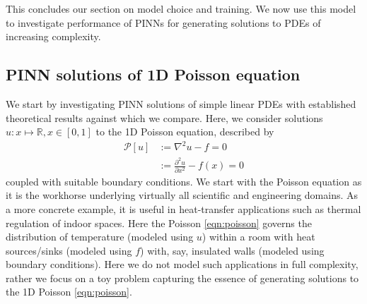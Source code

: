 \documentclass[11pt]{article}
\newcommand{\pde}{\ensuremath{\mathcal{P}}}
\begin{document}
This concludes our section on model choice and training. We now use this
model to investigate performance of
PINNs for generating solutions to PDEs of increasing complexity.

\subsection{PINN solutions of 1D Poisson equation}
\label{sec:poisson}
We start by investigating PINN solutions of simple linear PDEs with
established theoretical results against which we compare. Here, we consider
solutions \(u : x \mapsto \mathbb{R}, x \in [0, 1]\) to the 1D Poisson equation, described by
\begin{equation}
\label{eqn:poisson}
\begin{aligned}
	\pde[ u ] &:= \nabla^2 u  - f = 0 \\
	   		  &:= \frac{\partial^2 u}{\partial x^2} - f(x) = 0
\end{aligned}
\end{equation}
coupled with suitable boundary conditions. We start with the Poisson equation
as it is the workhorse
underlying virtually all scientific and engineering domains. As a more
concrete example, it is useful in heat-transfer applications such as thermal
regulation of indoor spaces. Here the Poisson \cref{eqn:poisson} governs the
distribution of temperature (modeled using \(u\)) within a room with heat
sources/sinks (modeled using \(f\)) with, say, insulated walls (modeled using
boundary conditions). Here we do not model such applications in full
complexity, rather we focus
on a toy problem capturing the essence of generating solutions to the 1D
Poisson \cref{eqn:poisson}.
\end{document}
